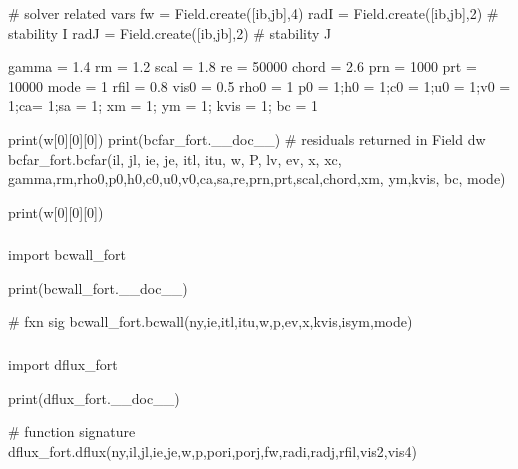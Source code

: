 \documentclass[letterpaper,10pt,english]{sphinxmanual}
\begin{document}
\sphinxAtStartPar
\# solver related vars
fw = Field.create({[}ib,jb{]},4)
radI = Field.create({[}ib,jb{]},2) \# stability I
radJ = Field.create({[}ib,jb{]},2) \# stability J

\sphinxAtStartPar
gamma = 1.4
rm = 1.2
scal = 1.8
re = 50000
chord = 2.6
prn = 1000
prt = 10000
mode = 1
rfil = 0.8
vis0 = 0.5
rho0 = 1
p0 = 1;h0 = 1;c0 = 1;u0 = 1;v0 = 1;ca= 1;sa = 1; xm = 1; ym = 1; kvis = 1; bc = 1

\sphinxAtStartPar
print(w{[}0{]}{[}0{]}{[}0{]})
print(bcfar\_fort.\_\_doc\_\_)
\# residuals returned in Field dw
bcfar\_fort.bcfar(il, jl, ie, je, itl, itu,       w, P, lv, ev,        x, xc,       gamma,rm,rho0,p0,h0,c0,u0,v0,ca,sa,re,prn,prt,scal,chord,xm,       ym,kvis,       bc,       mode)

\sphinxAtStartPar
print(w{[}0{]}{[}0{]}{[}0{]})


\subsubsection{}
\label{\detokenize{autoapi/tests/test_bcwall/index:module-tests.test_bcwall}}\label{\detokenize{autoapi/tests/test_bcwall/index:tests-test-bcwall}}\label{\detokenize{autoapi/tests/test_bcwall/index::doc}}
\sphinxAtStartPar
import bcwall\_fort

\sphinxAtStartPar
print(bcwall\_fort.\_\_doc\_\_)

\sphinxAtStartPar
\# fxn sig
bcwall\_fort.bcwall(ny,ie,itl,itu,w,p,ev,x,kvis,isym,mode)


\subsubsection{}
\label{\detokenize{autoapi/tests/test_dflux/index:module-tests.test_dflux}}\label{\detokenize{autoapi/tests/test_dflux/index:tests-test-dflux}}\label{\detokenize{autoapi/tests/test_dflux/index::doc}}
\sphinxAtStartPar
import dflux\_fort

\sphinxAtStartPar
print(dflux\_fort.\_\_doc\_\_)

\sphinxAtStartPar
\# function signature
dflux\_fort.dflux(ny,il,jl,ie,je,w,p,pori,porj,fw,radi,radj,rfil,vis2,vis4)
\end{document}
